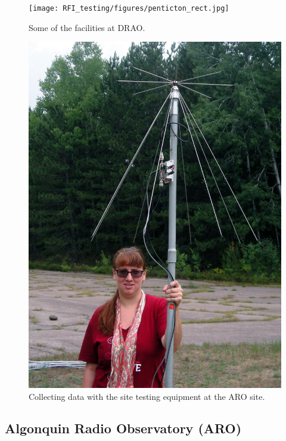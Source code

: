\begin{figure}[htb]
\centering
\begin{minipage}[b]{0.47\textwidth}
\centering
\texttt{[image: RFI\_testing/figures/penticton\_rect.jpg]}
\caption{Some of the facilities at DRAO.}
\label{Fig:penticton}
\end{minipage}%
\begin{minipage}[b]{0.02\textwidth}
\hspace{1cm}
\end{minipage}%
\begin{minipage}[b]{0.47\textwidth}
\centering
\includegraphics[width=0.95\linewidth]{RFI_testing/figures/voytek_site_test_alg.jpg}
\caption{Collecting data with the site testing equipment at the ARO site.}
\label{Fig:aroant}
\end{minipage}
\end{figure}

\subsection{Algonquin Radio Observatory (ARO)}

